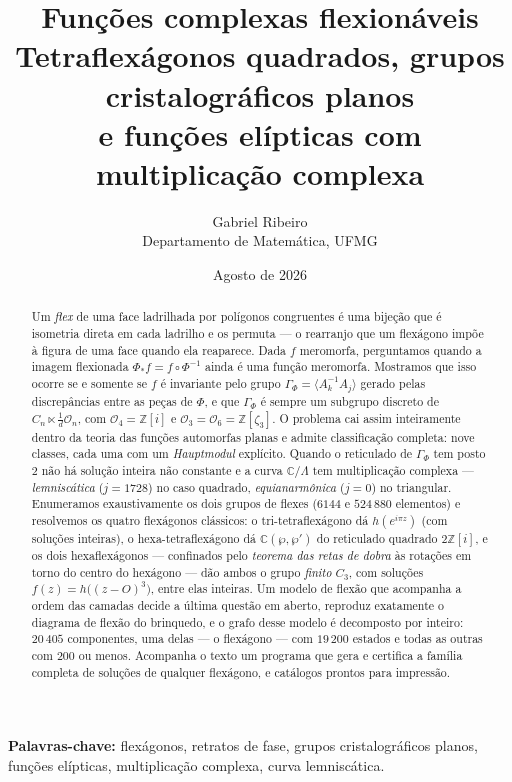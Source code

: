 \documentclass[11pt,a4paper]{article}
\title{\bfseries Funções complexas flexionáveis\\[2pt]
\large Tetraflexágonos quadrados, grupos cristalográficos planos\\
e funções elípticas com multiplicação complexa}
\author{Gabriel Ribeiro\\[-2pt]
\small Departamento de Matem\'atica, UFMG}
\date{\small Agosto de 2026}
\theoremstyle{plain}
\theoremstyle{definition}
\theoremstyle{remark}
\newcommand{\C}{\mathbb{C}}
\newcommand{\Z}{\mathbb{Z}}
\newcommand{\Zi}{\Z[i]}
\begin{document}
\maketitle
\vspace{-2.2\baselineskip}

\begin{abstract}
\noindent
Um \emph{flex} de uma face ladrilhada por polígonos congruentes é uma bijeção
que é isometria direta em cada ladrilho e os permuta --- o rearranjo que um
flexágono impõe à figura de uma face quando ela reaparece. Dada $f$ meromorfa,
perguntamos quando a imagem flexionada $\Phi_*f=f\circ\Phi^{-1}$ ainda é uma
função meromorfa. Mostramos que isso ocorre se e somente se $f$ é invariante
pelo grupo $\Gamma_\Phi=\langle A_k^{-1}A_j\rangle$ gerado pelas discrepâncias
entre as peças de $\Phi$, e que $\Gamma_\Phi$ é sempre um subgrupo discreto de
$C_n\ltimes\frac1d\mathcal O_n$, com $\mathcal O_4=\Zi$ e
$\mathcal O_3=\mathcal O_6=\Z[\zeta_3]$. O problema cai assim inteiramente
dentro da teoria das funções automorfas planas e admite classificação
completa: nove classes, cada uma com um \emph{Hauptmodul} explícito. Quando o
reticulado de $\Gamma_\Phi$ tem posto $2$ não há solução inteira não constante
e a curva $\C/\Lambda$ tem multiplicação complexa --- \emph{lemniscática}
($j=1728$) no caso quadrado, \emph{equianarmônica} ($j=0$) no
triangular. Enumeramos exaustivamente os dois grupos de flexes ($6144$ e
$524\,880$ elementos) e resolvemos os quatro flexágonos clássicos:
o tri-tetraflexágono dá $h(e^{i\pi z})$ (com soluções inteiras), o
hexa-tetraflexágono dá $\C(\wp,\wp')$ do reticulado quadrado $2\Zi$, e os
dois hexaflexágonos --- confinados pelo \emph{teorema das retas de dobra} às
rotações em torno do centro do hexágono --- dão ambos o grupo \emph{finito}
$C_3$, com soluções $f(z)=h\big((z-O)^3\big)$, entre elas inteiras. Um modelo
de flexão que acompanha a ordem das camadas decide a última questão em aberto,
reproduz exatamente o diagrama de flexão do brinquedo, e o grafo desse modelo
é decomposto por inteiro: $20\,405$ componentes, uma delas --- o flexágono ---
com $19\,200$ estados e todas as outras com $200$ ou menos. Acompanha o texto um
programa que gera e certifica a família completa de soluções de qualquer
flexágono, e catálogos prontos para impressão.
\end{abstract}

\medskip
\noindent\textbf{Palavras-chave:} flexágonos, retratos de fase, grupos
cristalográficos planos, funções elípticas, multiplicação complexa, curva
lemniscática.
\end{document}

